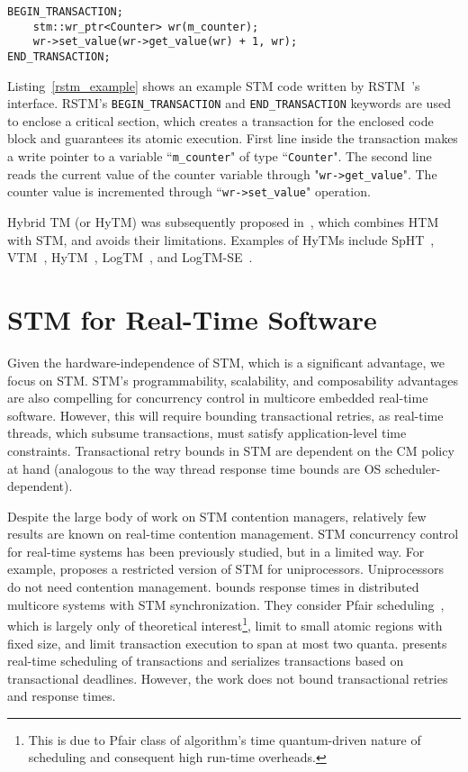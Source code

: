 \documentclass[12pt,english]{report}
\begin{document}
\lstset{language=C++}
\begin{lstlisting}[caption={STM example},label=rstm_example]
BEGIN_TRANSACTION;
	stm::wr_ptr<Counter> wr(m_counter);
	wr->set_value(wr->get_value(wr) + 1, wr);
END_TRANSACTION;
\end{lstlisting}

Listing~\ref{rstm_example} shows an example STM code written by  RSTM~\cite{Shriraman:2007:IHA:1250662.1250676}'s interface. RSTM's \texttt{BEGIN\_TRANSACTION} and \texttt{END\_TRANSACTION} keywords are used to enclose a critical section, which creates a transaction for the enclosed code block and guarantees its atomic execution. First line inside the transaction makes a write pointer to a variable ``\lstinline!m_counter!" of type ``\lstinline!Counter!". The second line reads the current value of the counter variable through "\lstinline!wr->get_value!". The counter value is incremented through ``\lstinline!wr->set_value!" operation.

Hybrid TM (or HyTM) was subsequently proposed in~\cite{FirstHyTMlie2004hardware}, 
which combines HTM with STM, and avoids their limitations. Examples of HyTMs include SpHT~\cite{SpHTLev:2008:SHT:1345206.1345236}, VTM~\cite{VTM1431581}, HyTM~\cite{dam06},
LogTM~\cite{logTM1598134}, and LogTM-SE~\cite{logTMSE4147667}.



\section{STM for Real-Time Software}

Given the hardware-independence of STM, which is a significant advantage, we focus on STM. STM's programmability, scalability, and composability advantages are also compelling for concurrency control in multicore embedded real-time software. However, this will require bounding transactional  retries, as real-time threads, which subsume transactions, must satisfy application-level time constraints.  Transactional retry bounds in STM are dependent on the CM policy at hand (analogous to the way thread response time bounds are OS scheduler-dependent). 

Despite the large body of work on STM contention managers, relatively few results are known on real-time contention management. STM concurrency control for real-time systems has been previously studied, but in a limited way. For example, \cite{manson2006preemptible} proposes a restricted version of STM for uniprocessors. Uniprocessors do not need contention management. \cite{fahmy2009bounding} bounds response times in distributed multicore systems with STM synchronization. They consider Pfair scheduling~\cite{holman-thesis04}, which is largely only of theoretical interest\footnote{This is due to Pfair class of algorithm's time quantum-driven nature of scheduling and consequent high run-time overheads.}, limit to small atomic regions with fixed size, and limit transaction execution to span at most two quanta. \cite{sarni2009real} presents real-time scheduling of transactions and serializes transactions based on transactional deadlines. However, the work does not bound transactional retries and response times. 
\end{document}

